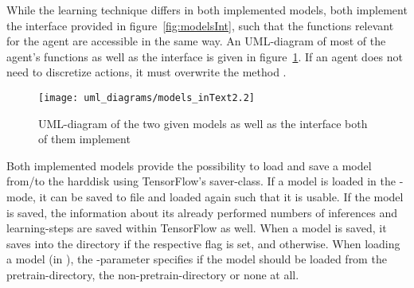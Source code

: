 \noindent While the learning technique differs in both implemented models, both implement the interface provided in figure~\ref{fig:modelsInt}, such that the functions relevant for the agent are accessible in the same way. An UML-diagram of most of the agent's functions as well as the interface is given in figure~\ref{fig:modelssmall}. If an agent does not need to discretize actions, it must overwrite the method .

\begin{figure}[h]
	\centering 
	\texttt{[image: uml\_diagrams/models\_inText2.2]}
	\caption[UML-diagram of the two models and their interface]{UML-diagram of the two given models as well as the interface both of them implement}
	\label{fig:modelssmall}
\end{figure}

Both implemented models provide the possibility to load and save a model from/to the harddisk using TensorFlow's saver-class. If a model is loaded in the -mode, it can be saved to file and loaded again such that it is usable. If the model is saved, the information about its already performed numbers of inferences and learning-steps are saved within TensorFlow as well. When a model is saved, it saves into the directory  if the respective flag is set, and  otherwise. When loading a model (in ), the -parameter specifies if the model should be loaded from the pretrain-directory, the non-pretrain-directory or none at all.


